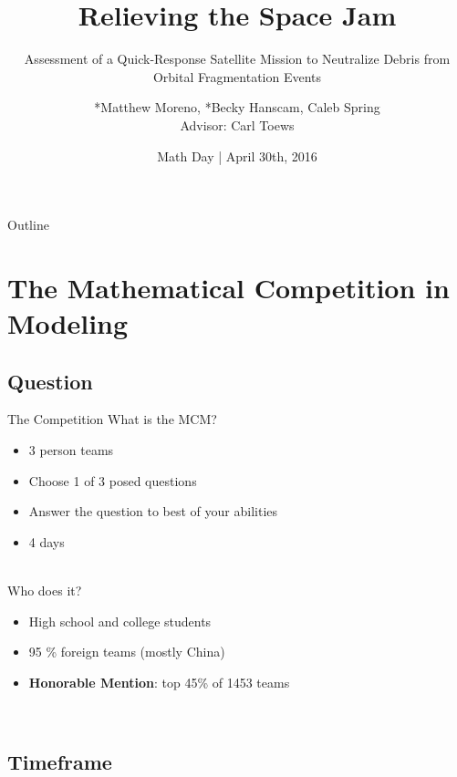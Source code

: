 \documentclass{beamer}
\title{Relieving the Space Jam}
\subtitle{Assessment of a Quick-Response Satellite Mission to Neutralize Debris from Orbital Fragmentation Events}
\author{*Matthew Moreno, *Becky Hanscam, Caleb Spring \\{\small Advisor: Carl Toews}}
\institute[University of Puget Sound] %
\date{Math Day | April 30th, 2016}
\begin{document}
\begin{frame}
  \titlepage
\end{frame}

\begin{frame}{Outline}
  \tableofcontents[hideallsubsections]
\end{frame}

\section{The Mathematical Competition in Modeling}

\subsection{Question}

\begin{frame}{The Competition}
    What is the MCM?
    \begin{itemize}
     \item {3 person teams}
     \item {Choose 1 of 3 posed questions}
     \item {Answer the question to best of your abilities}
     \item {4 days}
    \end{itemize}\\

    Who does it?
     \begin{itemize}
         \item {High school and college students}
         \item {95 \% foreign teams (mostly China)}
         \item {\textbf{Honorable Mention}: top 45\% of 1453 teams}
     \end{itemize}\\
  
\end{frame}

\subsection{Timeframe}
\end{document}

